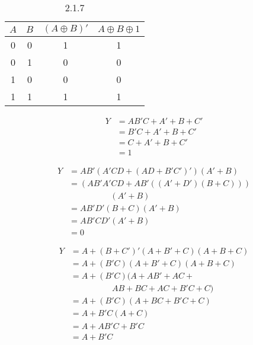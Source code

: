 \documentclass[lang=cn,11pt,a4paper,cite=authoryear,twocolumn]{elegantpaper}
\begin{document}

\begin{table}[htb]
    \centering
    \caption{2.1.7}
    \label{tab:my-table}
    \begin{tabular}{cccc}
    \hline
    \(A\) & \(B\) & \((A\oplus B)'\) & \(A\oplus B\oplus 1\) \\ \hline
    0     & 0     & 1                & 1                     \\
    0     & 1     & 0                & 0                     \\
    1     & 0     & 0                & 0                     \\
    1     & 1     & 1                & 1                     \\ \hline
    \end{tabular}
\end{table}



\[
\begin{aligned}
    Y &= AB'C + A' + B + C' \\ 
    &= B'C + A' + B + C' \\
    &= C + A' + B + C' \\ 
    &= 1
\end{aligned}    
\]


\[
\begin{aligned}
    Y &= AB'(A'CD + (AD + B'C')')(A'+B) \\
    &= (AB'A'CD + AB'((A'+D')(B+C))) \\
    & \quad\quad\quad\quad\quad (A'+B) \\ 
    &= AB'D'(B+C)(A'+B) \\
    &= AB'CD'(A'+B) \\ 
    &= 0
\end{aligned}    
\]


\[\begin{aligned}
    Y &= A + (B+C')'(A+B'+C)(A+B+C) \\
    &= A + (B'C)(A+B'+C)(A+B+C) \\
    &= A + (B'C)(A+AB'+AC+\\
    &\quad\quad\quad\quad\quad AB+BC+AC+B'C+C) \\
    &= A + (B'C)(A+BC+B'C+C) \\ 
    &= A + B'C(A+C) \\ 
    &= A + AB'C + B'C \\ 
    &= A + B'C
\end{aligned}\]
\end{document}
